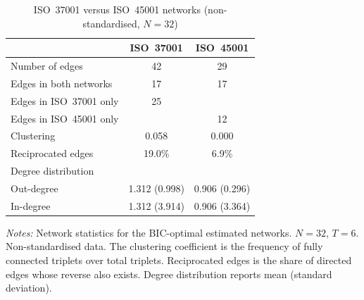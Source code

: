 \begin{table}[htbp]
\centering
\caption{ISO~37001 versus ISO~45001 networks (non-standardised, $N=32$)}
\label{tab:networks_nonstd}
\begin{tabular}{lcc}
\hline\hline
 & ISO~37001 & ISO~45001 \\
\hline
Number of edges & 42 & 29 \\
Edges in both networks & 17 & 17 \\
Edges in ISO~37001 only & 25 & \\
Edges in ISO~45001 only & & 12 \\
Clustering & 0.058 & 0.000 \\
Reciprocated edges & 19.0\% & 6.9\% \\
Degree distribution & & \\
\quad Out-degree & 1.312 (0.998) & 0.906 (0.296) \\
\quad In-degree & 1.312 (3.914) & 0.906 (3.364) \\
\hline\hline
\end{tabular}
\begin{minipage}{0.85\textwidth}
\vspace{4pt}
\footnotesize \textit{Notes:} Network statistics for the BIC-optimal estimated networks. $N=32$, $T=6$. Non-standardised data. The clustering coefficient is the frequency of fully connected triplets over total triplets. Reciprocated edges is the share of directed edges whose reverse also exists. Degree distribution reports mean (standard deviation).
\end{minipage}
\end{table}
